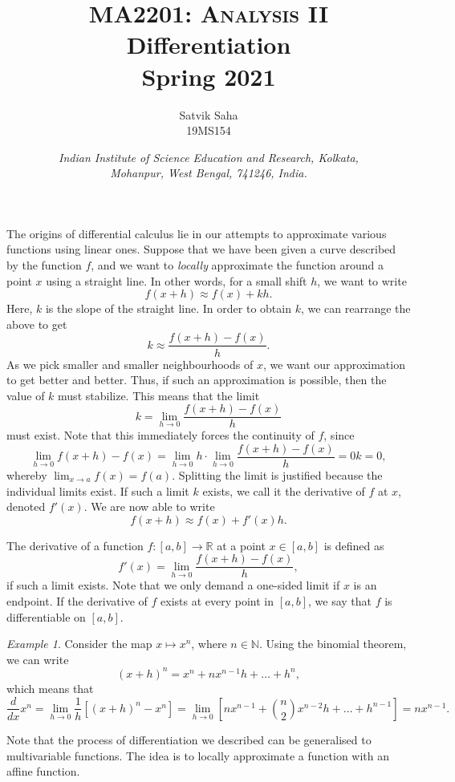 \documentclass[11pt]{article}
\title{
    \Large\textsc{MA2201: Analysis II} \\
    \Huge \textbf{Differentiation} \\
    \vspace{5pt}
    \Large{Spring 2021}
}
\author{
    \large Satvik Saha%
    \\\textsc{\small 19MS154}
}
\date{\normalsize
    \textit{Indian Institute of Science Education and Research, Kolkata, \\
    Mohanpur, West Bengal, 741246, India.} \\
}
\def\R{\mathbb{R}}
\def\N{\mathbb{N}}
\newcommand\ddx[1]{\frac{d #1}{d x}}
\theoremstyle{definition}
\theoremstyle{remark}
\newtheorem*{example}{Example}
\numberwithin{equation}{module}
\begin{document}
    \maketitle

    The origins of differential calculus lie in our attempts to approximate various
    functions using linear ones. Suppose that we have been given a curve described
    by the function $f$, and we want to \textit{locally} approximate the function
    around a point $x$ using a straight line. In other words, for a small shift $h$,
    we want to write \[
        f(x + h) \approx f(x) + kh.
    \] Here, $k$ is the slope of the straight line. In order to obtain $k$, we can
    rearrange the above to get \[
        k \approx \frac{f(x + h) - f(x)}{h}.
    \] As we pick smaller and smaller neighbourhoods of $x$, we want our
    approximation to get better and better. Thus, if such an approximation is
    possible, then the value of $k$ must stabilize. This means that the limit \[
        k = \lim_{h \to 0} \frac{f(x + h) - f(x)}{h}
    \] must exist. Note that this immediately forces the continuity of $f$, since \[
        \lim_{h \to 0} f(x + h) - f(x) = \lim_{h \to 0} h \cdot \lim_{h \to 0}
        \frac{f(x + h) - f(x)}{h} = 0k = 0,
    \] whereby $\lim_{x \to a} f(x) = f(a)$. Splitting the limit is justified
    because the individual limits exist.
    If such a limit $k$ exists, we call it the derivative of $f$ at $x$, denoted 
    $f'(x)$.
    We are now able to write \[
        f(x + h) \approx f(x) + f'(x)h.
    \] 

    \begin{definition}[Derivative]
        The derivative of a function $f\colon [a, b] \to \R$ at a point $x \in [a,
        b]$ is defined as \[
            f'(x) = \lim_{h \to 0} \frac{f(x + h) - f(x)}{h},
        \] if such a limit exists. Note that we only demand a one-sided limit if $x$
        is an endpoint.
        If the derivative of $f$ exists at every point in $[a, b]$, we say that $f$
        is differentiable on $[a, b]$.
    \end{definition}
    \begin{example}
        Consider the map $x \mapsto x^n$, where $n \in \N$. Using the binomial
        theorem, we can write \[
            (x + h)^n = x^n + nx^{n - 1}h + \dots + h^n,
        \] which means that \[
            \ddx{}x^n = \lim_{h \to 0} \frac{1}{h}\left[(x + h)^n - x^n\right] =
            \lim_{h \to 0}\left[ nx^{n - 1} + \binom{n}{2}x^{n - 2}h + \dots + h^{n
            - 1}\right] = nx^{n - 1}.
        \] 
    \end{example}
    Note that the process of differentiation we described can be generalised to
    multivariable functions. The idea is to locally approximate a function with an
    affine function. \\
\end{document}
